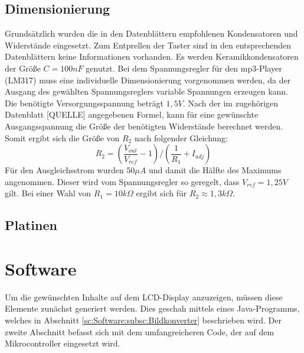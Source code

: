\documentclass[journal, a4paper]{IEEEtran}
\begin{document}
		
	\subsection{Dimensionierung}
		\label{sc:Hardware:subsc:Dimensionierung}
		Grundsätzlich wurden die in den Datenblättern empfohlenen Kondensatoren und Widerstände eingesetzt. Zum Entprellen der Taster sind in den entsprechenden Datenblättern keine Informationen vorhanden. Es werden Keramikkondensatoren der Größe $C=100 nF$ genutzt. Bei dem Spannungsregler für den mp3-Player (LM317) muss eine individuelle Dimensionierung vorgenommen werden, da der Ausgang des gewählten Spannungsreglers variable Spannungen erzeugen kann.
		Die benötigte Versorgungsspannung beträgt $1,5 V$. Nach der im zugehörigen Datenblatt [QUELLE] angegebenen Formel, kann für eine gewünschte Ausgangsspannung die Größe der benötigten Widerstände berechnet werden.  Somit ergibt sich die Größe von $R_2$ nach folgender Gleichung:
		\begin{equation}
			\label{eqn:1,5VDC}
			R_2 = (\frac{V_{out}}{V_{ref}}-1) / (\frac{1}{R_1}+I_{adj})
		\end{equation}	
		Für den Ausgleichsstrom wurden 50$\mu A$ und damit die Hälfte des Maximums angenommen. Dieser wird vom Spannungsregler so geregelt, dass $V_{ref} = 1,25 V$ gilt. Bei einer Wahl von $R_1 = 10k\Omega$ ergibt sich für $R_2 \approx 1,3 k\Omega$.
	\subsection{Platinen}
		\label{sc:Hardware:subsc:Platinen}
\section{Software}
	Um die gewünschten Inhalte auf dem LCD-Display anzuzeigen, müssen diese Elemente zunächst generiert werden. Dies geschah mittels eines Java-Programms, welches in Abschnitt \ref{sc:Software:subsc:Bildkonverter} beschrieben wird. Der zweite Abschnitt befasst sich mit dem umfangreicheren Code, der auf dem Mikrocontroller eingesetzt wird.
\end{document}
